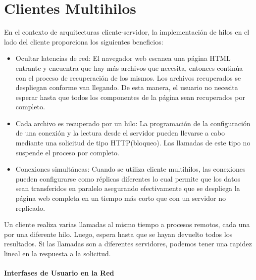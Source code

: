 \section{Clientes Multihilos}  

En el contexto de arquitecturas cliente-servidor, la implementación de hilos en el lado del cliente  proporciona los siguientes beneficios: 
 
		\begin{itemize}		
 
			\item   Ocultar latencias de red: El navegador web escanea una página HTML entrante y encuentra que hay más archivos que necesita, entonces  continúa con el proceso de recuperación de los mismos. Los archivos recuperados se despliegan conforme van llegando. De esta manera, el usuario no necesita esperar hasta que todos los componentes de la página sean recuperados por completo.
			
			\item Cada archivo es recuperado por un hilo: La programación de la configuración de una conexión y la lectura desde el servidor pueden llevarse a cabo mediante una  solicitud de tipo HTTP(bloqueo). Las llamadas de este tipo no suspende el proceso por completo.
			
			\item   Conexiones simultáneas:
			 	Cuando se utiliza cliente multihilos, las conexiones pueden configurarse como réplicas diferentes lo cual permite que los datos sean transferidos en paralelo asegurando efectivamente que se despliega 	la página web completa en un tiempo más corto que con un servidor no replicado.
		\end{itemize}        
 
	
	\begin{tcolorbox}
		[colback=green!5!white,colframe=green!75!black,fonttitle=\bfseries,title= Ejemplo: Múltiples llamadas a RPC]
		Un cliente realiza varias llamadas al mismo tiempo a procesos remotos, cada una por una diferente hilo. 
		Luego, espera hasta que se hayan devuelto todos los resultados. Si  las llamadas son a diferentes servidores, podemos tener una rapidez lineal en la respuesta a la solicitud.
	\end{tcolorbox}
	 

	
	\paragraph{Interfases de Usuario en la Red} 

